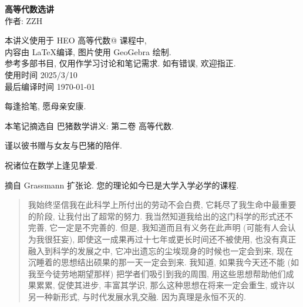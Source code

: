 \documentclass[UTF8]{book}
\makeatletter
\newcommand{\Rmnum}[1]{\expandafter\@slowromancap\romannumeral #1@}
\makeatother
\begin{document}



\begin{titlepage}
    \vspace*{10em}
\begin{center}
    \textbf{\songti 高等代数选讲} \\ %
    \vspace{4em} %
    作者: ZZH \\ %
    \vspace{10em} %

    本讲义使用于 HEO 高等代数\Rmnum{2} 课程中, \\
    内容由 \LaTeX 编译, 图片使用 GeoGebra 绘制. \\
    参考多部书目, 仅用作学习讨论和笔记需求. 如有错误, 欢迎指正. \\
    使用时间 2025/3/10\\

    最后编译时间 \today\\
\end{center}

\end{titlepage} 

\newpage

\vspace*{5em}

每逢拾笔, 愿母亲安康. 

本笔记摘选自 巴猪数学讲义: 第二卷 高等代数. 

谨以彼书赠与女友与巴猪的陪伴. 

祝诸位在数学上逢见挚爱. 

\vspace*{5em}

摘自 Grassmann 扩张论. 您的理论如今已是大学入学必学的课程. 

\begin{quotation}
    \kaishu
    我始终坚信我在此科学上所付出的劳动不会白费, 它耗尽了我生命中最重要的阶段, 
    让我付出了超常的努力. 我当然知道我给出的这门科学的形式还不完善, 
    它一定是不完善的. 但是, 我知道而且有义务在此声明 (可能有人会认为我很狂妄), 
    即使这一成果再过十七年或更长时间还不被使用, 也没有真正融入到科学的发展之中, 
    它冲出遗忘的尘埃现身的时候也一定会到来, 现在沉睡着的思想结出硕果的那一天一定会到来. 
    我知道, 如果我今天还不能 (如我至今徒劳地期望那样) 把学者们吸引到我的周围, 
    用这些思想帮助他们成果累累, 促使其进步, 丰富其学识, 
    那么这种思想在将来一定会重生, 或许以另一种新形式, 与时代发展水乳交融. 
    因为真理是永恒不灭的. 
    \songti
\end{quotation}
\end{document}
